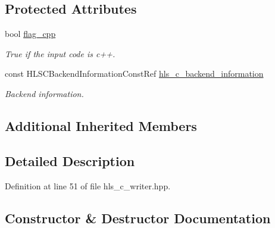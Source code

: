 \subsection*{Protected Attributes}
\begin{DoxyCompactItemize}
\item 
bool \hyperlink{classHLSCWriter_a7012939ffcb42f0ae795006e4f7fd6aa}{flag\+\_\+cpp}
\begin{DoxyCompactList}\small\item\em True if the input code is c++. \end{DoxyCompactList}\item 
const H\+L\+S\+C\+Backend\+Information\+Const\+Ref \hyperlink{classHLSCWriter_a885e26e7963d6efaa29b0ab47864ab8b}{hls\+\_\+c\+\_\+backend\+\_\+information}
\begin{DoxyCompactList}\small\item\em Backend information. \end{DoxyCompactList}\end{DoxyCompactItemize}
\subsection*{Additional Inherited Members}


\subsection{Detailed Description}


Definition at line 51 of file hls\+\_\+c\+\_\+writer.\+hpp.



\subsection{Constructor \& Destructor Documentation}
\mbox{\label{classHLSCWriter_a03b5e7b5c529d4de7a9ffbdf6146a604}} 
